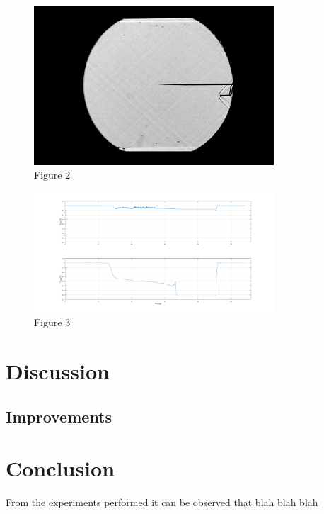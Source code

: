 \documentclass[8pt]{article}
\begin{document}
\begin{figure}
    \centering
    \includegraphics[width=0.8\textwidth]{working_state.jpg}
    \caption{Figure 2}
    \label{fig:figure2}
\end{figure}

\newpage

\begin{figure}
    \centering
    \includegraphics[width=0.8\textwidth]{tunnel_pressures.png}
    \caption{Figure 3}
    \label{fig:figure3}
\end{figure}

\newpage

\section{Discussion}


\subsection{Improvements}

\section{Conclusion}

From the experiments performed it can be observed that blah blah blah
\end{document}
